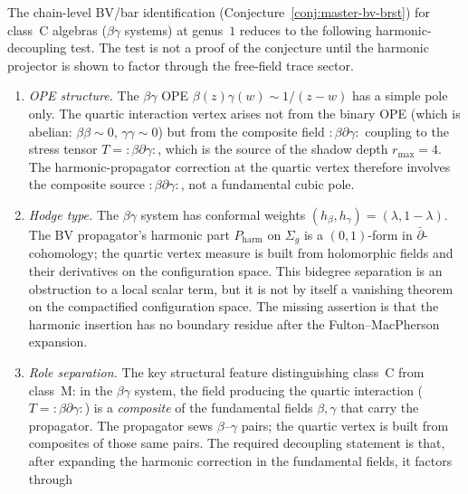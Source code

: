 \begin{remark}%
\label{rem:bv-bar-class-c-proof}%
%
%
%
The chain-level BV/bar identification
(Conjecture~\ref{conj:master-bv-brst})
for class~C algebras ($\beta\gamma$ systems) at genus~$1$ reduces to
the following harmonic-decoupling test. The test is not a proof of the
conjecture until the harmonic projector is shown to factor through the
free-field trace sector.
\begin{enumerate}[label=\textup{(\roman*)},nosep]
\item \emph{OPE structure.}
 The $\beta\gamma$ OPE $\beta(z)\gamma(w)
 \sim 1/(z{-}w)$ has a simple pole only.
 The quartic interaction vertex arises not from the
 binary OPE (which is abelian: $\beta\beta \sim 0$,
 $\gamma\gamma \sim 0$) but from the composite field
 $:\!\beta\partial\gamma\!:$ coupling to the stress tensor
 $T = :\!\beta\partial\gamma\!:$, which is the source of the
 shadow depth $r_{\max} = 4$.
 The harmonic-propagator correction at the quartic vertex
 therefore involves the composite source
 $:\!\beta\partial\gamma\!:$, not a fundamental cubic pole.
\item \emph{Hodge type.}
 The $\beta\gamma$ system has conformal weights
 $(h_\beta, h_\gamma) = (\lambda, 1{-}\lambda)$.
 The BV propagator's harmonic part $P_{\mathrm{harm}}$
 on $\Sigma_g$ is a $(0,1)$-form in
 $\bar\partial$-cohomology;
 the quartic vertex measure is built from holomorphic fields and their
 derivatives on the configuration space. This bidegree separation is an
 obstruction to a local scalar term, but it is not by itself a
 vanishing theorem on the compactified configuration space. The missing
 assertion is that the harmonic insertion has no boundary residue after
 the Fulton--MacPherson expansion.
\item \emph{Role separation.}
 The key structural feature distinguishing class~C from
 class~M: in the $\beta\gamma$ system, the field producing
 the quartic interaction ($T = :\!\beta\partial\gamma\!:$)
 is a \emph{composite} of the fundamental fields
 $\beta, \gamma$ that carry the propagator.
 The propagator sews $\beta$--$\gamma$ pairs;
 the quartic vertex is built from composites of those
 same pairs. The required decoupling statement is that, after expanding
 the harmonic correction in the fundamental fields, it factors through

\end{enumerate}
\end{remark}
